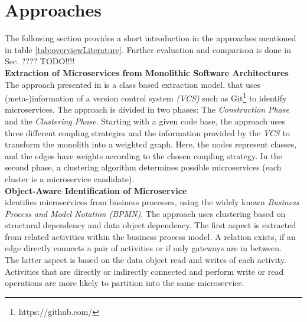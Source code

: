\clearpage





\section{Approaches}
\label{sec:stateOfTheArt:approaches}
The following section provides a short introduction in the approaches mentioned in table \ref{tab:overviewLiterature}. Further evaluation and comparison is done in Sec. ???? TODO!!!! \\

\noindent
\textbf{Extraction of Microservices from Monolithic Software Architectures   } \\
The approach presented in \cite{ExtractionMazlami} is a class based extraction model, that uses (meta-)information of a version control system \textit{(VCS)} such as Git\footnote{https://github.com/} to identify microservices. The approach is divided in two phases: The \textit{Construction Phase} and the \textit{Clustering Phase}.
Starting with a given code base, the approach uses three different coupling strategies and the information provided by the \textit{VCS} to transform the monolith into a weighted graph. Here, the nodes represent classes, and the edges have weights according to the chosen coupling strategy. In the second phase, a clustering algorithm determines possible microservices (each cluster is a microservice candidate). \\

\noindent
\textbf{Object-Aware Identification of Microservice  } \\
\cite{ObjectAwareAmiri} identifies microservices from business processes, using the widely known \textit{Business Process and Model Notation (BPMN)}. The approach uses clustering based on structural dependency and data object dependency. The first aspect is extracted from related activities within the business process model. A relation exists, if an edge directly connects a pair of activities or if only gateways are in between. \\
The latter aspect is based on the data object read and writes of each activity. Activities that are directly or indirectly connected and perform write or read operations are more likely to partition into the same microservice. \\


